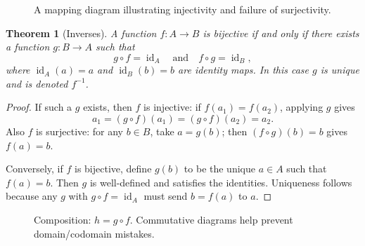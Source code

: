 \documentclass[12pt]{article}
\numberwithin{equation}{section}
\newcommand{\id}{\operatorname{id}}
\theoremstyle{plain}
\newtheorem{theorem}{Theorem}[section]
\theoremstyle{definition}
\theoremstyle{remark}
\begin{document}
\begin{figure}[H]
\centering
{}
\caption{A mapping diagram illustrating injectivity and failure of surjectivity.}
\end{figure}

\begin{theorem}[Inverses]\label{thm:inverse}
A function $f:A\to B$ is bijective if and only if there exists a function $g:B\to A$ such that
\[
g\circ f = \id_A
\quad\text{and}\quad
f\circ g = \id_B,
\]
where $\id_A(a)=a$ and $\id_B(b)=b$ are identity maps.
In this case $g$ is unique and is denoted $f^{-1}$.
\end{theorem}

\begin{proof}
If such a $g$ exists, then $f$ is injective: if $f(a_1)=f(a_2)$, applying $g$ gives
\[
a_1 = (g\circ f)(a_1) = (g\circ f)(a_2) = a_2.
\]
Also $f$ is surjective: for any $b\in B$, take $a=g(b)$; then $(f\circ g)(b)=b$ gives $f(a)=b$.

Conversely, if $f$ is bijective, define $g(b)$ to be the unique $a\in A$ such that $f(a)=b$. Then $g$ is well-defined and satisfies the identities.
Uniqueness follows because any $g$ with $g\circ f=\id_A$ must send $b=f(a)$ to $a$.
\end{proof}

\begin{figure}[H]
\centering
{}
\caption{Composition: $h=g\circ f$. Commutative diagrams help prevent domain/codomain mistakes.}
\end{figure}
\end{document}
